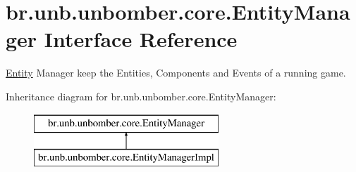 \hypertarget{interfacebr_1_1unb_1_1unbomber_1_1core_1_1_entity_manager}{\section{br.\+unb.\+unbomber.\+core.\+Entity\+Manager Interface Reference}
\label{interfacebr_1_1unb_1_1unbomber_1_1core_1_1_entity_manager}
}


\hyperlink{classbr_1_1unb_1_1unbomber_1_1core_1_1_entity}{Entity} Manager keep the Entities, Components and Events of a running game.  


Inheritance diagram for br.\+unb.\+unbomber.\+core.\+Entity\+Manager\+:\begin{figure}[H]
\begin{center}
\leavevmode
\includegraphics[height=2.000000cm]{interfacebr_1_1unb_1_1unbomber_1_1core_1_1_entity_manager}
\end{center}
\end{figure}
